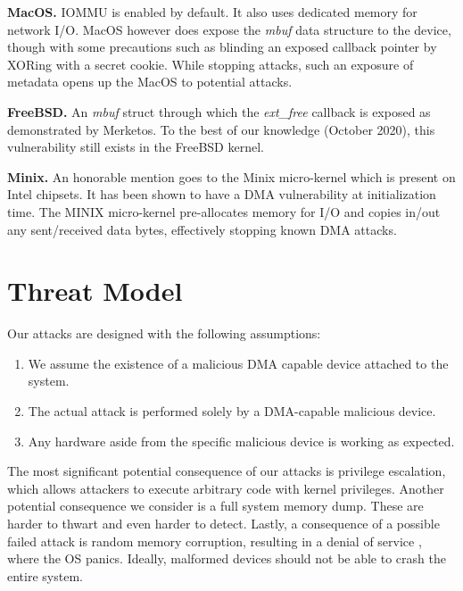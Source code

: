 \smallskip
\noindent\textbf{MacOS.} IOMMU is enabled by default. It also uses dedicated memory for network I/O. MacOS however does expose the \textit{mbuf} data structure to the device, though with some precautions such as blinding an exposed callback pointer by XORing with a secret cookie. While stopping \simple attacks, such an exposure of metadata opens up the MacOS to potential \compound attacks. 

\smallskip
\noindent\textbf{FreeBSD.} An \textit{mbuf} struct through which the \textit{ext\_free} callback is exposed as demonstrated by Merketos\cite{thunder}. To the best of our knowledge (October 2020), this vulnerability still exists in the FreeBSD kernel. 

\smallskip
\noindent\textbf{Minix.} An honorable mention goes to the Minix micro-kernel\cite{minix} which is present on Intel chipsets. It has been shown to have a DMA vulnerability at initialization time\cite{minix_intc}. The MINIX micro-kernel pre-allocates memory for I/O and copies in/out any sent/received data bytes, effectively stopping known DMA attacks. 

\section{Threat Model}\label{sec:threat_model}

Our attacks are designed with the following assumptions:
\begin{enumerate}
    \item We assume the existence of a malicious DMA capable device attached to the system.
    \item The actual attack is performed solely by a DMA-capable malicious device.
    \item Any hardware aside from the specific malicious device is working as expected.
 \end{enumerate}

The most significant potential consequence of our attacks is privilege escalation, which allows attackers to execute arbitrary code with kernel privileges. Another potential consequence we consider is a full system memory dump. These are harder to thwart and even harder to detect. Lastly, a consequence of a possible failed attack is random memory corruption, resulting in a denial of service \cite{MMT16}, where the OS panics. Ideally, malformed devices should not be able to crash the entire system. 
